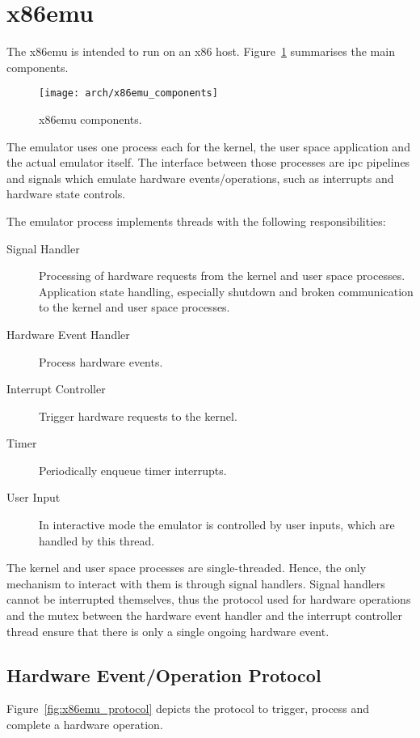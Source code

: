 %
%
%



\section{x86emu}
	The x86emu is intended to run \brickos on an x86 host. Figure~\ref{fig:x86emu_components} summarises the main components.

	\begin{figure}[h]
		\centering	
		\texttt{[image: arch/x86emu\_components]}
		\caption{x86emu components.}
		\label{fig:x86emu_components}
	\end{figure}

	The emulator uses one process each for the kernel, the user space application and the actual emulator itself. The interface between those processes are \gls{ipc} pipelines and signals which emulate hardware events/operations, such as interrupts and hardware state controls.

	The emulator process implements threads with the following responsibilities:
	\begin{description}
		\item[Signal Handler] Processing of hardware requests from the kernel and user space processes. Application state handling, especially shutdown and broken communication to the kernel and user space processes.
		\item[Hardware Event Handler] Process hardware events.
		\item[Interrupt Controller] Trigger hardware requests to the kernel.
		\item[Timer] Periodically enqueue timer interrupts.
		\item[User Input] In interactive mode the emulator is controlled by user inputs, which are handled by this thread.
	\end{description}

	The kernel and user space processes are single-threaded. Hence, the only mechanism to interact with them is through signal handlers. Signal handlers cannot be interrupted themselves, thus the protocol used for hardware operations and the mutex between the hardware event handler and the interrupt controller thread ensure that there is only a single ongoing hardware event.

	\subsection{Hardware Event/Operation Protocol}
		Figure~\ref{fig:x86emu_protocol} depicts the protocol to trigger, process and complete a hardware operation.

